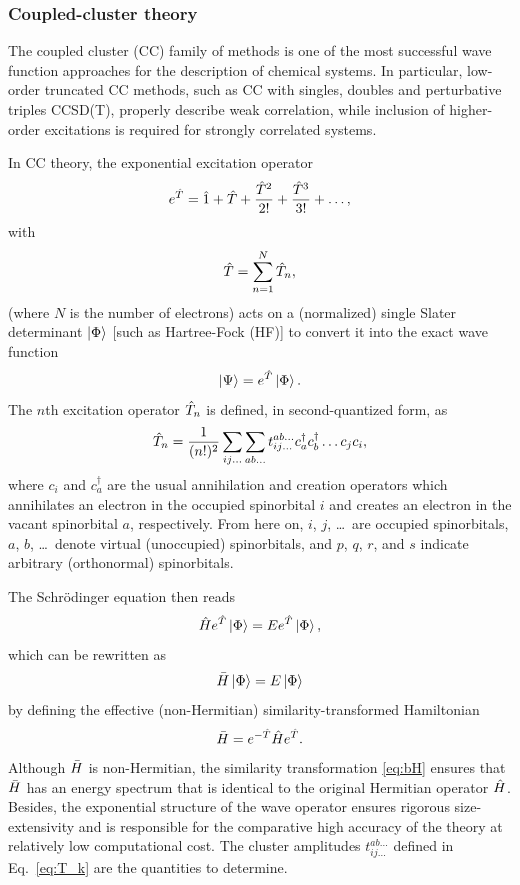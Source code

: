 \documentclass[aip,jcp,reprint,noshowkeys,superscriptaddress]{revtex4-1}
\newcommand{\hT}{\Hat{T}}
\newcommand{\hH}{\Hat{H}}
\newcommand{\hI}{\Hat{1}}
\begin{document}
\subsubsection*{Coupled-cluster theory}
The coupled cluster (CC) family of methods is one of the most successful wave function approaches for the description of chemical systems.\cite{ShavittBook}  
In particular, low-order truncated CC methods, such as CC with singles, doubles and perturbative triples CCSD(T), properly describe weak correlation, while inclusion of higher-order excitations is required for strongly correlated systems.

In CC theory, the exponential excitation operator 
\begin{equation}
	e^{\hT} = \hI + \hT + \frac{\hT^2}{2!} + \frac{\hT^3}{3!} + \ldots,
\end{equation}
with 
\begin{equation}
	\hT = \sum_{n=1}^N \hT_n,
\end{equation}
(where $N$ is the number of electrons) acts on a (normalized) single Slater determinant $\ket{\Phi}$ [such as Hartree-Fock (HF)] to convert it into the exact wave function 
\begin{equation}
	\ket{\Psi} = e^{\hT} \ket{\Phi}.
\end{equation}
The $n$th excitation operator $\hT_n$ is defined, in second-quantized form, as
\begin{equation}
	\label{eq:T_k}
	\hT_n = \frac{1}{(n!)^2} \sum_{ij\dots} \sum_{ab\dots} t_{ij\dots}^{ab\dots} c_a^{\dag} c_b^{\dag} \dots c_j c_i,
\end{equation}
where $c_i$ and $c_a^{\dag}$ are the usual annihilation and creation operators which annihilates an electron in the occupied spinorbital $i$ and creates an electron in the vacant spinorbital $a$, respectively.
From here on, $i$, $j$, \ldots~are occupied spinorbitals, $a$, $b$, \ldots~denote virtual (unoccupied) spinorbitals, and $p$, $q$, $r$, and $s$ indicate arbitrary (orthonormal) spinorbitals.

The Schr\"odinger equation then reads
\begin{equation}
	\hH e^{\hT} \ket{\Phi} = E e^{\hT} \ket{\Phi},
\end{equation}
which can be rewritten as 
\begin{equation}
	\Bar{H} \ket{\Phi} = E \ket{\Phi}
\end{equation}
by defining the effective (non-Hermitian) similarity-transformed Hamiltonian 
\begin{equation}
	\label{eq:bH}
	\Bar{H} = e^{-\hT} \hH e^{\hT}.
\end{equation}
Although $\Bar{H}$ is non-Hermitian, the similarity transformation \eqref{eq:bH} ensures that $\Bar{H}$ has an energy spectrum that is identical to the original Hermitian operator $\hH$.
Besides, the exponential structure of the wave operator ensures rigorous size-extensivity and is responsible for the comparative high accuracy of the theory at relatively low computational cost.
The cluster amplitudes $t_{ij\dots}^{ab\dots}$ defined in Eq.~\eqref{eq:T_k} are the quantities to determine.
\end{document}
